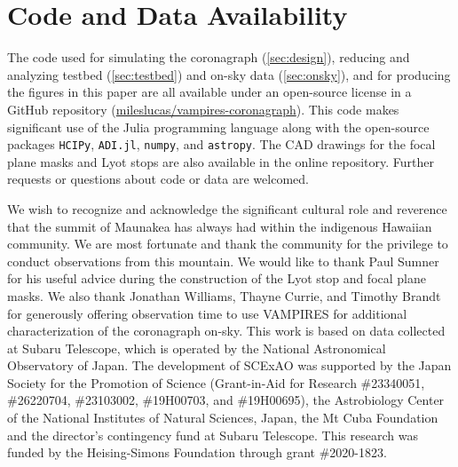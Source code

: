 \documentclass[]{spie}  %
\begin{document}

\appendix    %


\section{Code and Data Availability}\label{sec:code}

The code used for simulating the coronagraph (\autoref{sec:design}), reducing and analyzing testbed (\autoref{sec:testbed}) and on-sky data (\autoref{sec:onsky}), and for producing the figures in this paper are all available under an open-source license in a GitHub repository (\href{https://github.com/mileslucas/vampires-coronagraph}{mileslucas/vampires-coronagraph}). This code makes significant use of the Julia programming language\cite{bezanson2017} along with the open-source packages \texttt{HCIPy}\cite{por2018}, \texttt{ADI.jl}\cite{lucas2020}, \texttt{numpy}\cite{harris2020}, and \texttt{astropy}\cite{astropycollaboration2013,astropycollaboration2018}. The CAD drawings for the focal plane masks and Lyot stops are also available in the online repository. Further requests or questions about code or data are welcomed.

\acknowledgments

We wish to recognize and acknowledge the significant cultural role and reverence that the summit of Maunakea has always had within the indigenous Hawaiian community. We are most fortunate and thank the community for the privilege to conduct observations from this mountain. We would like to thank Paul Sumner for his useful advice during the construction of the Lyot stop and focal plane masks. We also thank Jonathan Williams, Thayne Currie, and Timothy Brandt for generously offering observation time to use VAMPIRES for additional characterization of the coronagraph on-sky. This work is based on data collected at Subaru Telescope, which is operated by the National Astronomical Observatory of Japan. The development of SCExAO was supported by the Japan Society for the Promotion of Science (Grant-in-Aid for Research \#23340051, \#26220704, \#23103002, \#19H00703, and \#19H00695), the Astrobiology Center of the National Institutes of Natural Sciences, Japan, the Mt Cuba Foundation and the director's contingency fund at Subaru Telescope. This research was funded by the Heising-Simons Foundation through grant \#2020-1823.


\end{document}
